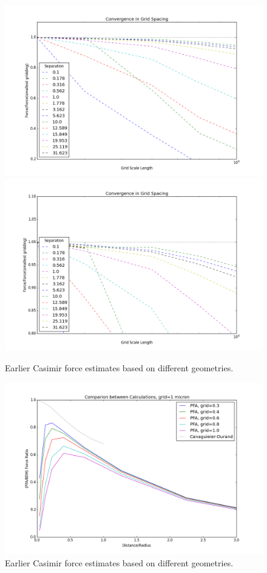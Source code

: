 \documentclass[11pt,traditabstract]{article}
\begin{document}
\begin{figure}[h]
\centering
\includegraphics[width=5.5in]{pfa_convergence}
\includegraphics[width=5.5in]{pfa_convergence_zoom}
\caption{Earlier Casimir force estimates based on different geometries.}\label{fig:conv2}
\end{figure}

\begin{figure}[h]
\centering
\includegraphics[width=7in]{pfa_v_pec}
\caption{Earlier Casimir force estimates based on different geometries.}\label{fig:geometric}
\end{figure}
\end{document}
